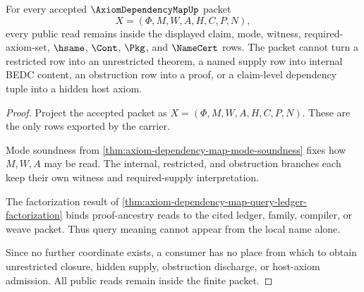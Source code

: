 \begin{theorem}
\label{thm:axiom-dependency-map-boundary}
For every accepted $\AxiomDependencyMapUp$ packet
$$
X=(\Phi,M,W,A,H,C,P,N),
$$
every public read remains inside the displayed claim, mode, witness, required-axiom-set, $\hsame$, $\Cont$, $\Pkg$, and $\NameCert$ rows. The packet cannot turn a restricted row into an unrestricted theorem, a named supply row into internal BEDC content, an obstruction row into a proof, or a claim-level dependency tuple into a hidden host axiom.
\end{theorem}
\begin{proof}
Project the accepted packet as $X=(\Phi,M,W,A,H,C,P,N)$. These are the only rows exported by the carrier.

Mode soundness from \autoref{thm:axiom-dependency-map-mode-soundness} fixes how $M,W,A$ may be read. The internal, restricted, and obstruction branches each keep their own witness and required-supply interpretation.

The factorization result of \autoref{thm:axiom-dependency-map-query-ledger-factorization} binds proof-ancestry reads to the cited ledger, family, compiler, or weave packet. Thus query meaning cannot appear from the local name alone.

Since no further coordinate exists, a consumer has no place from which to obtain unrestricted closure, hidden supply, obstruction discharge, or host-axiom admission. All public reads remain inside the finite packet.
\end{proof}

